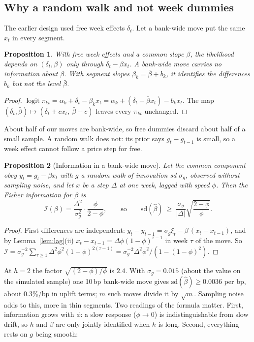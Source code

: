 \documentclass[11pt,a4paper]{article}
\newtheorem{proposition}{Proposition}[section]
\theoremstyle{remark}
\newcommand{\logit}{\operatorname{logit}}
\begin{document}
\subsection{Why a random walk and not week dummies}\label{sec:rw}
The earlier design used free week effects $\delta_t$. Let a bank-wide move put the same $x_t$ in
every segment.
\begin{proposition}\label{prop:common}
With free week effects and a common slope $\beta$, the likelihood depends on $(\delta_t,\beta)$ only
through $\delta_t-\beta x_t$. A bank-wide move carries no information about $\beta$. With
segment slopes $\beta_k=\bar\beta+b_k$, it identifies the differences $b_k$ but not the level
$\bar\beta$.
\end{proposition}
\begin{proof}
$\logit\pi_{kt}=\alpha_k+\delta_t-\beta_kx_t=\alpha_k+(\delta_t-\bar\beta x_t)-b_kx_t$. The map
$(\delta_t,\bar\beta)\mapsto(\delta_t+cx_t,\ \bar\beta+c)$ leaves every $\pi_{kt}$ unchanged.
\end{proof}
About half of our moves are bank-wide, so free dummies discard about half of a small sample. A
random walk does not: its prior says $g_t-g_{t-1}$ is small, so a week effect cannot follow a
price step for free.
\begin{proposition}[Information in a bank-wide move]\label{prop:info}
Let the common component obey $y_t=g_t-\beta x_t$ with $g$ a random walk of innovation sd
$\sigma_g$, observed without sampling noise, and let $x$ be a step $\Delta$ at one week, lagged with
speed $\phi$. Then the Fisher information for $\beta$ is
\[
\mathcal I(\beta)=\frac{\Delta^2}{\sigma_g^2}\cdot\frac{\phi}{2-\phi},
\qquad\text{so}\qquad \mathrm{sd}(\hat\beta)\ \ge\ \frac{\sigma_g}{|\Delta|}\sqrt{\frac{2-\phi}{\phi}} .
\]
\end{proposition}
\begin{proof}
First differences are independent: $y_t-y_{t-1}=\sigma_g\xi_t-\beta\,(x_t-x_{t-1})$, and by
Lemma~\ref{lem:lag}(ii) $x_t-x_{t-1}=\Delta\phi(1-\phi)^{\tau-1}$ in week $\tau$ of the move. So
$\mathcal I=\sigma_g^{-2}\sum_{\tau\ge1}\Delta^2\phi^2(1-\phi)^{2(\tau-1)}=\sigma_g^{-2}\Delta^2\phi^2/(1-(1-\phi)^2)$.
\end{proof}
At $h=2$ the factor $\sqrt{(2-\phi)/\phi}$ is $2.4$. With $\sigma_g=0.015$ (about the value on the
simulated sample) one 10\,bp bank-wide move gives $\mathrm{sd}(\hat\beta)\ge0.0036$ per bp, about
$0.3\%$/bp in uplift terms; $m$ such moves divide it by $\sqrt m$. Sampling noise adds to this, more in thin segments.
Two readings of the formula matter. First, information grows with $\phi$: a slow response
($\phi\to0$) is indistinguishable from slow drift, so $h$ and $\beta$ are only jointly identified
when $h$ is long. Second, everything rests on $g$ being smooth:
\end{document}
